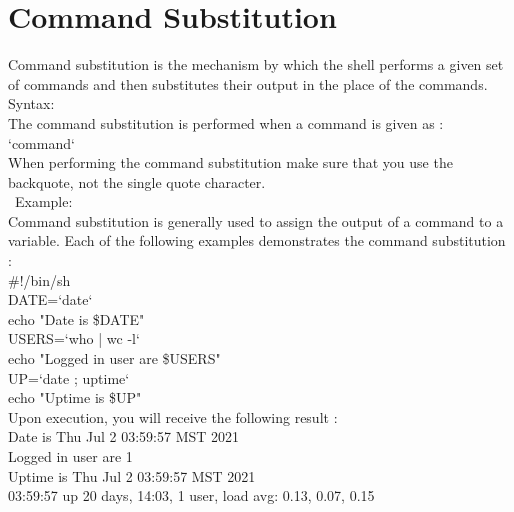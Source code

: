 \documentclass{article}
\begin{document}
\section*{Command Substitution}
Command substitution is the mechanism by which the shell performs a given set of commands and then substitutes their output in the place of the commands.\\
Syntax:\\
The command substitution is performed when a command is given as :\\
`command`\\
When performing the command substitution make sure that you use the backquote, not the single quote character.\\\
Example:\\
Command substitution is generally used to assign the output of a command to a variable. Each of the following examples demonstrates the command substitution :\\
\#!/bin/sh\\
DATE=`date`\\
echo "Date is \$DATE"\\
USERS=`who | wc -l`\\
echo "Logged in user are \$USERS"\\
UP=`date ; uptime`\\
echo "Uptime is \$UP"\\
Upon execution, you will receive the following result :\\
Date is Thu Jul  2 03:59:57 MST 2021\\
Logged in user are 1\\
Uptime is Thu Jul  2 03:59:57 MST 2021\\
03:59:57 up 20 days, 14:03,  1 user,  load avg: 0.13, 0.07, 0.15\\

\end{document}
